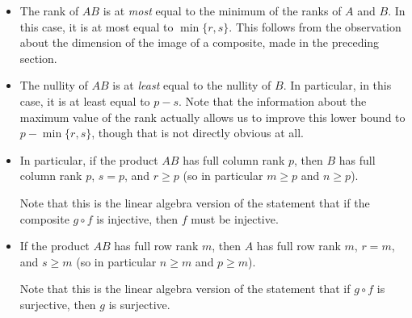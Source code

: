 \documentclass[10pt]{amsart}
\begin{document}
\begin{itemize}
\item The rank of $AB$ is at {\em most} equal to the minimum of the
  ranks of $A$ and $B$. In this case, it is at most equal to $\min \{
  r,s \}$. This follows from the observation about the dimension of
  the image of a composite, made in the preceding section.
\item The nullity of $AB$ is at {\em least} equal to the nullity of
  $B$. In particular, in this case, it is at least equal to $p -
  s$. Note that the information about the maximum value of the rank
  actually allows us to improve this lower bound to $p - \min \{ r,
  s\}$, though that is not directly obvious at all.
\item In particular, if the product $AB$ has full column rank $p$,
  then $B$ has full column rank $p$, $s = p$, and $r \ge p$ (so in
  particular $m \ge p$ and $n \ge p$).
 
  Note that this is the linear algebra version of the statement that
  if the composite $g \circ f$ is injective, then $f$ must be
  injective.
\item If the product $AB$ has full row rank $m$, then $A$ has full row
  rank $m$, $r = m$, and $s \ge m$ (so in particular $n \ge m$ and $p
  \ge m$).

  Note that this is the linear algebra version of the statement that
  if $g \circ f$ is surjective, then $g$ is surjective.
\end{itemize}
\end{document}
